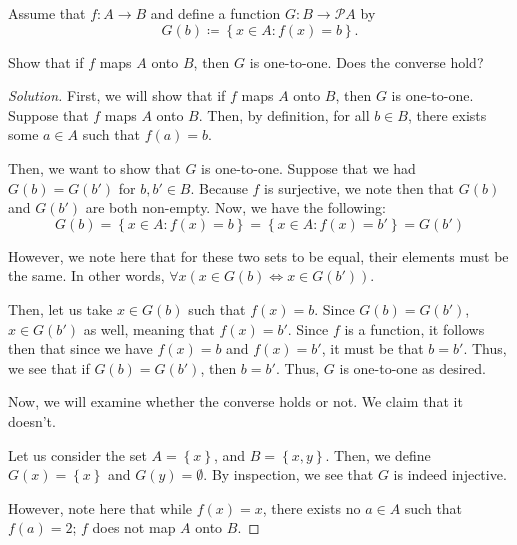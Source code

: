 \documentclass{article}
\newenvironment{solution}{\begin{proof}[Solution]}{\end{proof}}
\renewcommand\qedsymbol{$\blacksquare$}
\newenvironment{innerproof}{\renewcommand{\qedsymbol}{$\square$}\proof}{\endproof}
\newcommand{\brc}[1]{ \left\{  {#1} \right\}}
\begin{document}
	\begin{hw}{29}
		Assume that $f : A \rightarrow B$ and define a function $G : B \rightarrow \mathscr{P}A$ by 
		\begin{equation*}
			G(b) \coloneq \brc{x \in A : f(x) = b}.
		\end{equation*} 
	
		Show that if $f$ maps $A$ onto $B$, then $G$ is one-to-one. Does the converse hold?
	\end{hw}
	\begin{solution}
		First, we will show that if $f$ maps $A$ onto $B$, then $G$ is one-to-one.
		\begin{innerproof}
			Suppose that $f$ maps $A$ onto $B$. Then, by definition, for all $b \in B$, there exists some $a \in A$ such that $f(a) = b$.
			
			Then, we want to show that $G$ is one-to-one. Suppose that we had $G(b) = G(b')$ for $b, b' \in B$. Because $f$ is surjective, we note then that $G(b)$ and $G(b')$ are both non-empty. Now, we have the following:
			\begin{equation*}
				G(b) = \brc{x \in A : f(x) = b} = \brc{x \in A : f(x) = b'} = G(b')
			\end{equation*}
			
			However, we note here that for these two sets to be equal, their elements must be the same. In other words, $\forall x(x \in G(b) \iff x \in G(b'))$.
			
			Then, let us take $x \in G(b)$ such that $f(x) = b$. Since $G(b) = G(b')$, $x \in G(b')$ as well, meaning that $f(x) = b'$. Since $f$ is a function, it follows then that since we have $f(x) = b$ and $f(x) = b'$, it must be that $b = b'$. Thus, we see that if $G(b) = G(b')$, then $b = b'$. Thus, $G$ is one-to-one as desired.
		\end{innerproof}
	
		Now, we will examine whether the converse holds or not.
		\begin{innerproof}
			We claim that it doesn't.
			
			Let us consider the set $A = \brc{x}$, and $B = \brc{x,y}$. Then, we define $G(x) = \brc{x}$ and $G(y) = \emptyset$. By inspection, we see that $G$ is indeed injective.
			
			However, note here that while $f(x) = x$, there exists no $a \in A$ such that $f(a) = 2$; $f$ does not map $A$ onto $B$.
		\end{innerproof}
	\end{solution}
\end{document}
